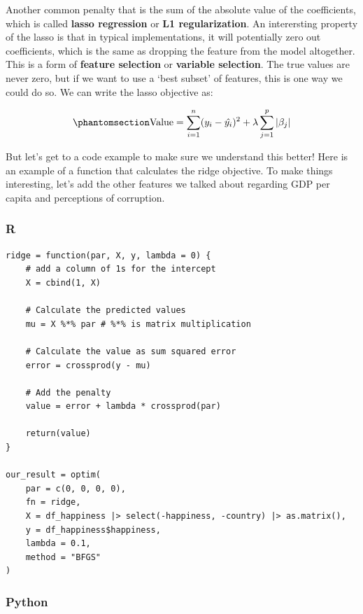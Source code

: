 \documentclass[
  letterpaper,
]{krantz}
\begin{document}
Another common penalty that is the sum of the absolute value of the
coefficients, which is called \textbf{lasso regression} or \textbf{L1
regularization}. An interersting property of the lasso is that in
typical implementations, it will potentially zero out coefficients,
which is the same as dropping the feature from the model altogether.
This is a form of \textbf{feature selection} or \textbf{variable
selection}. The true values are never zero, but if we want to use a
`best subset' of features, this is one way we could do so. We can write
the lasso objective as:

\begin{equation}\phantomsection\label{eq-estim-lasso}{
\textrm{Value} = \sum_{i=1}^{n} (y_i - \hat{y_i})^2 + \lambda \sum_{j=1}^{p} |\beta_j|
}\end{equation}

But let's get to a code example to make sure we understand this better!
Here is an example of a function that calculates the ridge objective. To
make things interesting, let's add the other features we talked about
regarding GDP per capita and perceptions of corruption.

\subsubsection{R}

\begin{verbatim}
ridge = function(par, X, y, lambda = 0) {
    # add a column of 1s for the intercept
    X = cbind(1, X)

    # Calculate the predicted values
    mu = X %*% par # %*% is matrix multiplication

    # Calculate the value as sum squared error
    error = crossprod(y - mu)

    # Add the penalty
    value = error + lambda * crossprod(par)

    return(value)
}

our_result = optim(
    par = c(0, 0, 0, 0),
    fn = ridge,
    X = df_happiness |> select(-happiness, -country) |> as.matrix(),
    y = df_happiness$happiness,
    lambda = 0.1,
    method = "BFGS"
)
\end{verbatim}

\subsubsection{Python}
\end{document}
